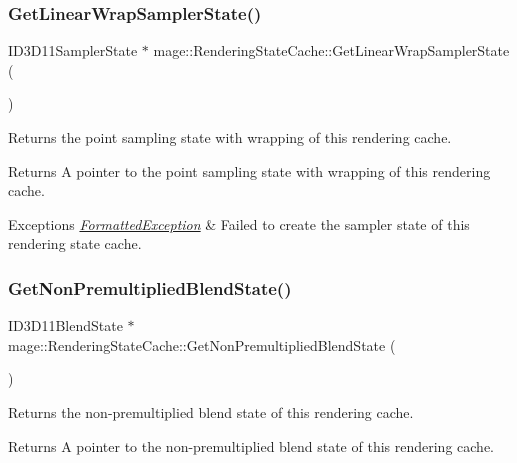 \subsubsection{\texorpdfstring{Get\+Linear\+Wrap\+Sampler\+State()}{GetLinearWrapSamplerState()}}
{\footnotesize\ttfamily I\+D3\+D11\+Sampler\+State $\ast$ mage\+::\+Rendering\+State\+Cache\+::\+Get\+Linear\+Wrap\+Sampler\+State (\begin{DoxyParamCaption}{ }\end{DoxyParamCaption})}

Returns the point sampling state with wrapping of this rendering cache.

\begin{DoxyReturn}{Returns}
A pointer to the point sampling state with wrapping of this rendering cache. 
\end{DoxyReturn}

\begin{DoxyExceptions}{Exceptions}
{\em \hyperlink{structmage_1_1_formatted_exception}{Formatted\+Exception}} & Failed to create the sampler state of this rendering state cache. \\
\hline
\end{DoxyExceptions}
\hypertarget{structmage_1_1_rendering_state_cache_ae1b3d9745e1761e45908d9ad7c4f29dd}{}\label{structmage_1_1_rendering_state_cache_ae1b3d9745e1761e45908d9ad7c4f29dd} 
\subsubsection{\texorpdfstring{Get\+Non\+Premultiplied\+Blend\+State()}{GetNonPremultipliedBlendState()}}
{\footnotesize\ttfamily I\+D3\+D11\+Blend\+State $\ast$ mage\+::\+Rendering\+State\+Cache\+::\+Get\+Non\+Premultiplied\+Blend\+State (\begin{DoxyParamCaption}{ }\end{DoxyParamCaption})}

Returns the non-\/premultiplied blend state of this rendering cache.

\begin{DoxyReturn}{Returns}
A pointer to the non-\/premultiplied blend state of this rendering cache. 
\end{DoxyReturn}

